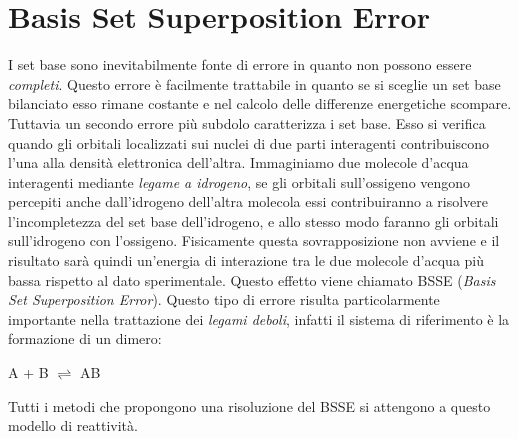 \documentclass[oneside]{amsbook}
\numberwithin{section}{chapter}
\numberwithin{equation}{section}
\numberwithin{figure}{section}
\begin{document}
\section{Basis Set Superposition Error }
I set base sono inevitabilmente fonte di errore in quanto non possono essere \emph{completi}. Questo errore è facilmente trattabile in quanto se si sceglie un set base bilanciato esso rimane costante e nel calcolo delle differenze energetiche scompare. 
Tuttavia un secondo errore più subdolo caratterizza i set base. Esso si verifica quando gli orbitali localizzati sui nuclei di due parti interagenti contribuiscono l'una alla densità elettronica dell'altra. Immaginiamo due molecole d'acqua interagenti mediante \textit{legame a idrogeno}, se gli orbitali sull'ossigeno vengono percepiti anche dall'idrogeno dell'altra molecola essi contribuiranno a risolvere l'incompletezza del set base dell'idrogeno, e allo stesso modo faranno gli orbitali sull'idrogeno con l'ossigeno. Fisicamente questa sovrapposizione non avviene  e il risultato sarà quindi un'energia di interazione tra le due molecole d'acqua più bassa rispetto al dato sperimentale. Questo effetto viene chiamato BSSE (\emph{Basis Set Superposition Error}).
Questo tipo di errore risulta particolarmente importante nella trattazione dei \emph{legami deboli}, infatti il sistema di riferimento è la formazione di un dimero:
\begin{center}
A + B $\rightleftharpoons$ AB
\end{center}
Tutti i metodi che propongono una risoluzione del BSSE si attengono a questo modello di reattività.
\end{document}
